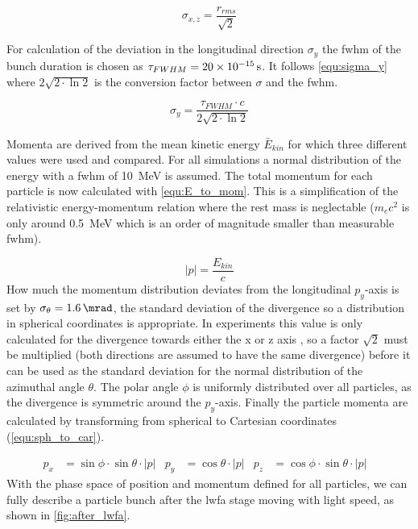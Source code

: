 \documentclass[bachelor_thesis]{subfiles}
\begin{document}
\begin{equation}
	\sigma_{x,z}=\frac{r_{rms}}{\sqrt{2}} 
	\label{equ:sigma_x}
\end{equation}

For calculation of the deviation in the longitudinal direction $\sigma_y$ the \gls{fwhm} of the bunch duration is chosen as $\tau_{FWHM}=\qty{20d-15}{\s}$. 
It follows \autoref{equ:sigma_y} where $2\sqrt{2\cdot\ln{2}}$ is the conversion factor between $\sigma$ and the \gls{fwhm}.

\begin{equation}
	\sigma_{y}=\frac{\tau_{FWHM}\cdot c}{2\sqrt{2\cdot\ln{2}}}
	\label{equ:sigma_y}
\end{equation}

Momenta are derived from the mean kinetic energy $\bar{E}_{kin}$ for which three different  values were used and compared. 
For all simulations a normal distribution of the energy with a \gls{fwhm} of \qty{10}{\MeV} is assumed. The total momentum for each particle is now calculated with \autoref{equ:E_to_mom}.
This is a simplification of the relativistic energy-momentum relation where the rest mass is neglectable ($m_{e}c^2$ is only around \qty{0.5}{\MeV} which is an order of magnitude smaller than measurable \gls{fwhm}).

\begin{equation}
	\left|p\right|=\frac{E_{kin}}{c}
	\label{equ:E_to_mom}
\end{equation}
How much the momentum distribution deviates from the longitudinal $p_y$-axis is set by $\sigma_{\theta}=\qty{1.6}{\mrad}$, the standard deviation of the divergence  so a distribution in spherical coordinates is appropriate. 
In experiments this value is only calculated for the divergence towards either the x or z axis , so a factor $\sqrt{2}$ must be multiplied (both directions are assumed to have the same divergence) before 
it can be used as the standard deviation for the normal distribution of the azimuthal angle $\theta$. The polar angle $\phi$ is uniformly distributed over all particles, as the divergence is symmetric around the $p_y$-axis.
Finally the particle momenta are calculated by transforming from spherical to Cartesian coordinates (\autoref{equ:sph_to_car}). 

\begin{align}
	p_x&=\sin{\phi} \cdot \sin{\theta} \cdot \left|p\right|	&
	p_y&=\cos{\theta} \cdot \left|p\right|				&
	p_z&=\cos{\phi} \cdot \sin{\theta} \cdot \left|p\right|	&
	\label{equ:sph_to_car}
\end{align}
With the phase space of position and momentum defined for all particles, we can fully describe a particle bunch after the \gls{lwfa} stage moving with light speed, as shown in \autoref{fig:after_lwfa}.
\end{document}
